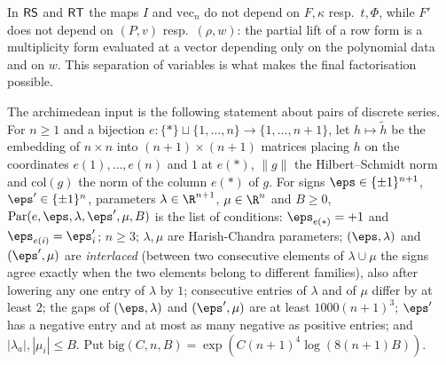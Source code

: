 In $\mathsf{RS}$ and $\mathsf{RT}$ the maps $I$ and $\mathrm{vec}_n$ do not depend on $F,\kappa$ resp.\ $t,\Phi$, while $F'$ does not
depend on $(P,v)$ resp.\ $(\rho,w)$: the partial lift of a row form is a multiplicity form evaluated at a vector depending only
on the polynomial data and on $w$. This separation of variables is what makes the final factorisation possible.

The archimedean input is the following statement about pairs of discrete series. For $n\ge1$ and a bijection
$e\colon\{\ast\}\sqcup\{1,\dots,n\}\to\{1,\dots,n+1\}$, let $h\mapsto\tilde h$ be the embedding of $n\times n$ into
$(n+1)\times(n+1)$ matrices placing $h$ on the coordinates $e(1),\dots,e(n)$ and $1$ at $e(\ast)$, $\|g\|$ the Hilbert--Schmidt
norm and $\mathrm{col}(g)$ the norm of the column $e(\ast)$ of $g$. For signs $\eps\in\{\pm1\}^{n+1}$, $\eps'\in\{\pm1\}^n$,
parameters $\lambda\in\R^{n+1}$, $\mu\in\R^n$ and $B\ge0$, $\mathrm{Par}(e,\eps,\lambda,\eps',\mu,B)$ is the list of conditions:
$\eps_{e(\ast)}=+1$ and $\eps_{e(i)}=\eps'_i$; $n\ge3$; $\lambda,\mu$ are Harish-Chandra parameters; $(\eps,\lambda)$ and
$(\eps',\mu)$ are \emph{interlaced} (between two consecutive elements of $\lambda\cup\mu$ the signs agree exactly when the two
elements belong to different families), also after lowering any one entry of $\lambda$ by $1$; consecutive entries of $\lambda$
and of $\mu$ differ by at least $2$; the gaps of $(\eps,\lambda)$ and $(\eps',\mu)$ are at least $1000(n+1)^3$; $\eps'$ has a
negative entry and at most as many negative as positive entries; and $|\lambda_a|,|\mu_i|\le B$. Put
$\mathrm{big}(C,n,B)=\exp(C(n+1)^4\log(8(n+1)B))$.

